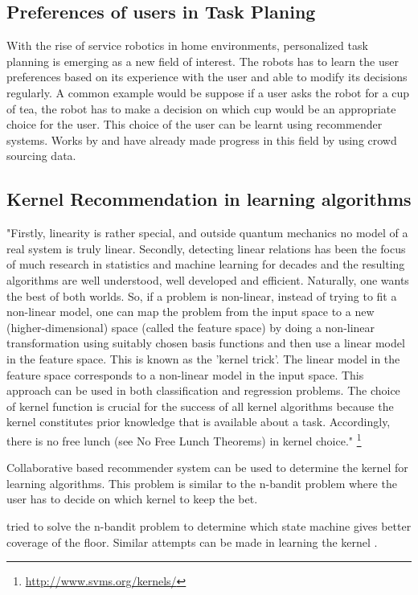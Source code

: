 \subsection{Preferences of users in Task Planing}
With the rise of service robotics in home environments, 
personalized task planning is emerging as a new field of interest.
The robots has to learn the user preferences based on its experience 
with the user and able to modify its decisions regularly.
A common example would be suppose if a user asks the robot for a cup of 
tea, the robot has to make a decision on which cup would be an appropriate 
choice for the user. This choice of the user can be learnt using 
recommender systems.
Works by \cite{abdo_learning_2013} and \cite{abdo_robot_2015} have already 
made progress in this field by using crowd sourcing data.

\subsection{Kernel Recommendation in learning algorithms}
"Firstly, linearity is rather special, and outside quantum mechanics no
model of a real system is truly linear. Secondly, detecting linear
relations has been the focus of much research in statistics and machine
learning for decades and the resulting algorithms are well understood, well
developed and efficient. Naturally, one wants the best of both worlds. So, if a
problem is non-linear, instead of trying to fit a non-linear model, one can map
the problem from the input space to a new (higher-dimensional) space (called
the feature space) by doing a non-linear transformation using suitably chosen
basis functions and then use a linear model in the feature space. This is known
as the 'kernel trick'. The linear model in the feature space corresponds to a
non-linear model in the input space. This approach can be used in both
classification and regression problems. The choice of kernel function is
crucial for the success of all kernel algorithms because the kernel constitutes
prior knowledge that is available about a task. Accordingly, there is no free
lunch (see No Free Lunch Theorems) in kernel choice."
\footnote{\url{http://www.svms.org/kernels/}}

Collaborative based recommender system can be used to determine the kernel 
for learning algorithms. This problem is similar to the n-bandit problem where
the user has to decide on which kernel to keep the bet.

\cite{matikainen_multi-armed_2013} tried to solve the n-bandit problem to
determine which state machine gives better coverage of the floor.
Similar attempts can be made in learning the kernel .

